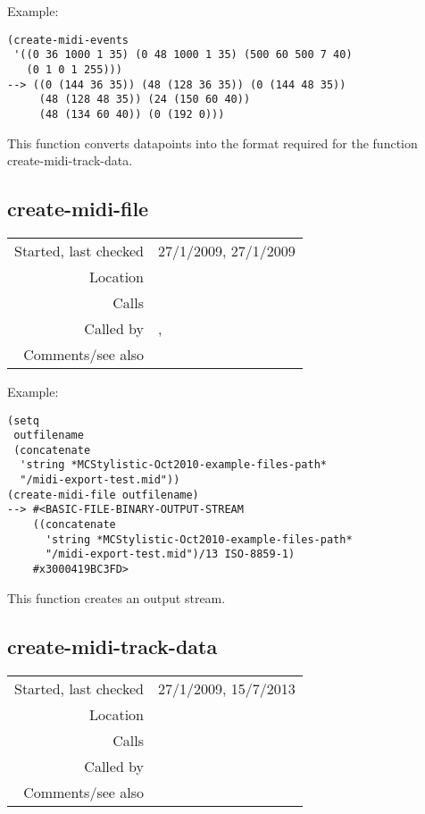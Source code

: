 \vspace{0.5cm}
\noindent Example:
\begin{verbatim}
(create-midi-events
 '((0 36 1000 1 35) (0 48 1000 1 35) (500 60 500 7 40)
   (0 1 0 1 255)))
--> ((0 (144 36 35)) (48 (128 36 35)) (0 (144 48 35))
     (48 (128 48 35)) (24 (150 60 40))
     (48 (134 60 40)) (0 (192 0)))
\end{verbatim}

\noindent This function converts datapoints into the
format required for the function
create-midi-track-data.


\subsection*{create-midi-file}\label{fun:create-midi-file}

\vspace{0.3cm}
\begin{tabular}{r|p{8cm}}
Started, last checked & 27/1/2009, 27/1/2009 \\
Location & \nameref{sec:MIDI-export} \\
Calls & \\
Called by & \nameref{fun:save-as-midi}, \nameref{fun:saveit} \\
Comments/see also &
\end{tabular}

\vspace{0.5cm}
\noindent Example:
\begin{verbatim}
(setq
 outfilename
 (concatenate
  'string *MCStylistic-Oct2010-example-files-path*
  "/midi-export-test.mid"))
(create-midi-file outfilename)
--> #<BASIC-FILE-BINARY-OUTPUT-STREAM
    ((concatenate
      'string *MCStylistic-Oct2010-example-files-path*
      "/midi-export-test.mid")/13 ISO-8859-1)
    #x3000419BC3FD>
\end{verbatim}

\noindent This function creates an output stream.


\subsection*{create-midi-track-data}\label{fun:create-midi-track-data}

\vspace{0.3cm}
\begin{tabular}{r|p{8cm}}
Started, last checked & 27/1/2009, 15/7/2013 \\
Location & \nameref{sec:MIDI-export} \\
Calls & \nameref{fun:make-var-len} \\
Called by & \nameref{fun:create-MTrk} \\
Comments/see also &
\end{tabular}


